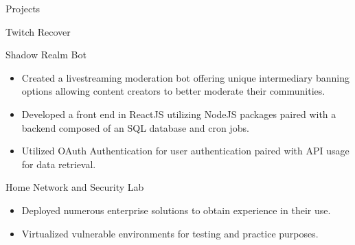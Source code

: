 \documentclass{article}
\newlength{\tabin}
\newlength{\secsep}
\newcommand{\lineunder}{\vspace*{-8pt} \\ \hspace*{-6pt} \hrulefill \\ \vspace*{-15pt}}
\newenvironment{tabbedsection}[1]{
  \begin{list}{}{
      \setlength{\itemsep}{0pt}
      \setlength{\labelsep}{0pt}
      \setlength{\labelwidth}{0pt}
      \setlength{\leftmargin}{\tabin}
      \setlength{\rightmargin}{\tabin}
      \setlength{\listparindent}{0pt}
      \setlength{\parsep}{0pt}
      \setlength{\parskip}{0pt}
      \setlength{\partopsep}{0pt}
      \setlength{\topsep}{#1}
    }
  \item[]
}{\end{list}}
\newenvironment{resume_section}[1]{
  \filbreak
  \vspace{2\secsep}
  \textsc{\large#1}
  \lineunder
  \begin{tabbedsection}{\secsep}
}{\end{tabbedsection}}
\newenvironment{resume_subsection}[2][]{
  \textbf{#2} \hfill {\normalsize #1} \hspace{-5em}
  \begin{tabbedsection}{0.5\secsep}
}{\end{tabbedsection}}
\newenvironment{subitems}{
  \renewcommand{\labelitemi}{-}
  \begin{itemize}
      \setlength{\labelsep}{1em}
}{\end{itemize}}
\begin{document}
\begin{resume_section}{Projects}
\begin{resume_subsection}{Twitch Recover}
\begin{subitems}
		\end{subitems}
	\end{resume_subsection}
	\vspace{3\secsep}
	\begin{resume_subsection}{Shadow Realm Bot}
		\begin{subitems}
			\item Created a livestreaming moderation bot offering unique intermediary banning options allowing content creators to better moderate their communities.
			\item Developed a front end in ReactJS utilizing NodeJS packages paired with a backend composed of an SQL database and cron jobs.
			\item Utilized OAuth Authentication for user authentication paired with API usage for data retrieval.
		\end{subitems}
	\end{resume_subsection}
	\vspace{3\secsep}
  	\begin{resume_subsection}{Home Network and Security Lab}
  		\begin{subitems}
  			\item Deployed numerous enterprise solutions to obtain experience in their use.
  			\item Virtualized vulnerable environments for testing and practice purposes.
  		\end{subitems}
  	\end{resume_subsection}
\end{resume_section}

\vspace{3\secsep}
\end{document}
